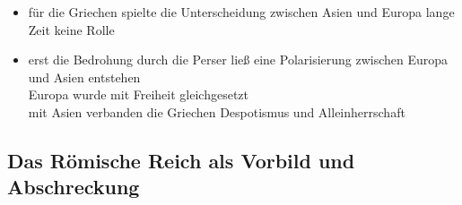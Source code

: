 \documentclass[11pt,a4paper]{article}
\begin{document}
\begin{itemize}
\item für die Griechen spielte die Unterscheidung zwischen Asien und Europa lange Zeit keine Rolle
\item erst die Bedrohung durch die Perser ließ eine Polarisierung zwischen Europa und Asien entstehen\\
 Europa wurde mit Freiheit gleichgesetzt\\
 mit Asien verbanden die Griechen Despotismus und Alleinherrschaft
\end{itemize}


\subsection*{\textsf{Das Römische Reich als Vorbild und Abschreckung}}
\end{document}

